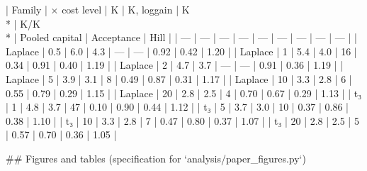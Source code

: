 | Family | × cost level | K | K, loggain | K\\* | K/K\\* | Pooled capital | Acceptance | Hill |
| --- | --- | --- | --- | --- | --- | --- | --- | --- |
| Laplace | 0.5 | 6.0 | 4.3 | — | — | 0.92 | 0.42 | 1.20 |
| Laplace | 1 | 5.4 | 4.0 | 16 | 0.34 | 0.91 | 0.40 | 1.19 |
| Laplace | 2 | 4.7 | 3.7 | — | — | 0.91 | 0.36 | 1.19 |
| Laplace | 5 | 3.9 | 3.1 | 8 | 0.49 | 0.87 | 0.31 | 1.17 |
| Laplace | 10 | 3.3 | 2.8 | 6 | 0.55 | 0.79 | 0.29 | 1.15 |
| Laplace | 20 | 2.8 | 2.5 | 4 | 0.70 | 0.67 | 0.29 | 1.13 |
| t₃ | 1 | 4.8 | 3.7 | 47 | 0.10 | 0.90 | 0.44 | 1.12 |
| t₃ | 5 | 3.7 | 3.0 | 10 | 0.37 | 0.86 | 0.38 | 1.10 |
| t₃ | 10 | 3.3 | 2.8 | 7 | 0.47 | 0.80 | 0.37 | 1.07 |
| t₃ | 20 | 2.8 | 2.5 | 5 | 0.57 | 0.70 | 0.36 | 1.05 |

## Figures and tables (specification for `analysis/paper_figures.py`)

